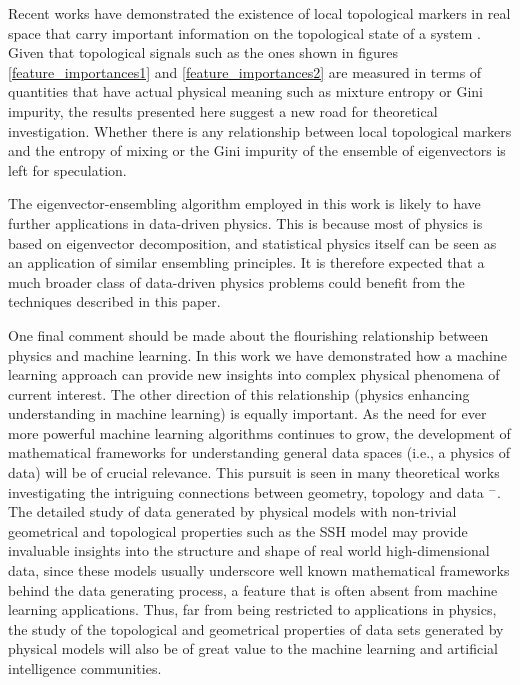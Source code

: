 \documentclass[fleqn,10pt]{wlscirep}
\begin{document}
Recent works have demonstrated the existence of local topological markers in real space that carry important information on the topological state of a system \cite{PhysRevB.84.241106,caio2019topological}.  Given that topological signals such as the ones shown in figures \ref{feature_importances1} and \ref{feature_importances2} are measured in terms of quantities that have actual physical meaning such as mixture entropy or Gini impurity, the results presented here suggest a new road for theoretical investigation. Whether there is any relationship between local topological markers and the entropy of mixing or the Gini impurity of the ensemble of eigenvectors is left for speculation.

The eigenvector-ensembling algorithm employed in this work is likely to have further applications in data-driven physics. This is because most of physics is based on eigenvector decomposition, and statistical physics itself can be seen as an application of similar ensembling principles. It is therefore expected that a much broader class of data-driven physics problems could benefit from the techniques described in this paper.

One final comment should be made about the flourishing relationship between physics and machine learning. In this work we have demonstrated how a machine learning approach can provide new insights into complex physical phenomena of current interest. The other direction of this relationship (physics enhancing understanding in machine learning) is equally important. As the need for ever more powerful machine learning algorithms continues to grow, the development of mathematical frameworks for understanding general data spaces (i.e., a physics of data) will be of crucial relevance. This pursuit is seen in many theoretical works investigating the intriguing connections between geometry, topology and data \cite{carlsson2009topology}$^-$\cite{belkin2003problems}. The detailed study of data generated by physical models with non-trivial geometrical and topological properties such as the SSH model may provide invaluable insights into the structure and shape of real world high-dimensional data, since these models usually underscore well known mathematical frameworks behind the data generating process, a feature that is often absent from machine learning applications. Thus, far from being restricted to applications in physics, the study of the topological and geometrical properties of data sets generated by physical models will also be of great value to the machine learning and artificial intelligence communities.  
\end{document}
